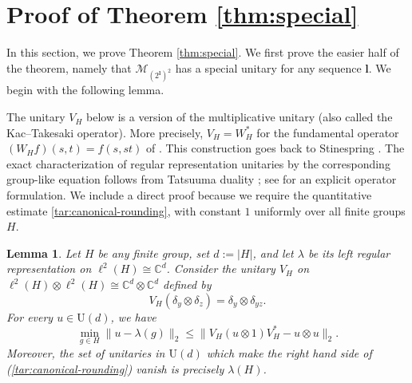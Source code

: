 \documentclass[12pt]{amsart}
\numberwithin{equation}{section}
\newtheorem{lem}[thm]{Lemma}
\theoremstyle{definition}
\newcommand{\C}{\mathbb{C}}
\def\M{\mathcal{M}}
\def \M{\mathcal{M}}
\begin{document}
\section{Proof of Theorem \ref{thm:special}}\label{sec:special}

In this section, we prove Theorem \ref{thm:special}.  We first prove the easier half of the theorem, namely that $\M_{(2^\mathbf{l})^2}$ has a special unitary for any sequence $\mathbf{l}$.  We begin with the following lemma. 

The unitary $V_H$ below is a version of the 
multiplicative unitary (also called the Kac--Takesaki operator). More precisely,
$V_H=W_H^*$ for the fundamental operator
$(W_Hf)(s,t)=f(s,st)$ of
\cite[page 2 and Proposition 2.4.7]{enockschwartz1992kac}.
This construction goes back to Stinespring
\cite{stinespring1959integration}.
The exact characterization of regular representation unitaries
by the corresponding group-like equation follows from
Tatsuuma duality \cite{tatsuuma1967duality}; see
\cite[Section 0]{woronowicz1996multiplicative}
for an explicit operator formulation.
We include a direct proof because we require the quantitative
estimate \eqref{tar:canonical-rounding}, with constant $1$
uniformly over all finite groups $H$.

\begin{lem}\label{tar:canonical-copier}
Let $H$ be any finite group, set $d:=|H|$, and let $\lambda$ be its left
regular representation on $\ell^2(H)\cong \C^d$.  Consider the unitary $V_H$ on $\ell^2(H)\otimes \ell^2(H)\cong \C^d\otimes \C^d$ defined by
\[
 V_H(\delta_y\otimes\delta_z)=\delta_y\otimes\delta_{yz}.
\]
For every $u\in\mathrm U(d)$, we have
\begin{equation}
 \min_{g\in H}\|u-\lambda(g)\|_2
 \leq \|V_H(u\otimes1)V_H^*-u\otimes u\|_2.
 \label{tar:canonical-rounding}
\end{equation}
Moreover, the set of unitaries in $\mathrm U(d)$ which make the right hand side of (\ref{tar:canonical-rounding}) vanish is precisely $\lambda(H)$. 
\end{lem}
\end{document}
